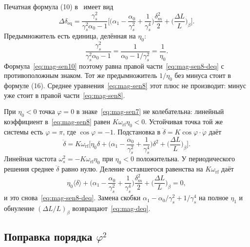 Печатная формула (10) в~\cite{Senichev2013} имеет вид
\begin{equation}
\label{eq:mag-sen10}
\Delta\delta_{\mathrm{eq}}
=
\frac{\gamma_s^2}{\gamma_s^2\alpha_0-1}
\Biggl[
\Biggl(\alpha_1-\frac{\alpha_0}{\gamma_s^2}+\frac{1}{\gamma_s^4}\Biggr)
\frac{\delta_m^2}{2}
+\Biggl(\frac{\Delta L}{L}\Biggr)_{\!\beta}
\Biggr].
\end{equation}
Предымножитель есть единица, делённая на $\eta_0$:
\begin{equation}
\label{eq:mag-prefactor}
\frac{\gamma_s^2}{\gamma_s^2\alpha_0-1}
=\frac{1}{\alpha_0-1/\gamma_s^2}
=\frac{1}{\eta_0}.
\end{equation}
Формула~\eqref{eq:mag-sen10} поэтому равна правой части~\eqref{eq:mag-sen8-deq} с противоположным знаком. Тот же предымножитель $1/\eta_0$ без минуса стоит в формуле (16). Среднее уравнения~\eqref{eq:mag-sen8} этот плюс не производит: минус уже стоит в правой части~\eqref{eq:mag-sen8}.

При $\eta_0<0$ точка $\varphi=0$ в знаке~\eqref{eq:mag-sen7} не колебательна: линейный коэффициент в~\eqref{eq:mag-sen8} равен $K\omega_{\mathrm{rf}}\eta_0<0$. Устойчивая точка той же системы есть $\varphi=\pi$, где $\cos\varphi=-1$. Подстановка в $\ddot\delta=K\cos\varphi\cdot\dot\varphi$ даёт
\begin{equation}
\label{eq:mag-sen-stable}
\ddot\delta
=K\omega_{\mathrm{rf}}
\Biggl[
\eta_0\delta
+\Biggl(\alpha_1-\frac{\alpha_0}{\gamma_s^2}+\frac{1}{\gamma_s^4}\Biggr)\delta^2
+\Biggl(\frac{\Delta L}{L}\Biggr)_{\!\beta}
\Biggr].
\end{equation}
Линейная частота $\omega_s^2=-K\omega_{\mathrm{rf}}\eta_0$ при $\eta_0<0$ положительна. У периодического решения среднее $\ddot\delta$ равно нулю. Деление оставшегося равенства на $K\omega_{\mathrm{rf}}$ даёт
\begin{equation}
\label{eq:mag-sen-stable-avg}
\eta_0\langle\delta\rangle
+\Biggl(\alpha_1-\frac{\alpha_0}{\gamma_s^2}+\frac{1}{\gamma_s^4}\Biggr)\frac{\delta_m^2}{2}
+\Biggl(\frac{\Delta L}{L}\Biggr)_{\!\beta}
=0,
\end{equation}
и это снова~\eqref{eq:mag-sen8-deq}. Замена скобки $\alpha_1-\alpha_0/\gamma_s^2+1/\gamma_s^4$ на полное $\eta_1$ и обнуление $(\Delta L/L)_\beta$ возвращают~\eqref{eq:mag-deq}.

\subsection{Поправка порядка \texorpdfstring{$\varphi^2$}{phi\^2}}
\label{sec:phi2}

